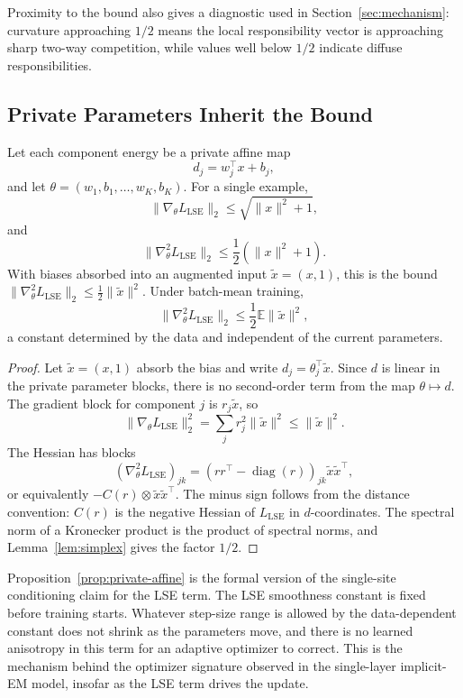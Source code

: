 Proximity to the bound also gives a diagnostic used in
Section~\ref{sec:mechanism}: curvature approaching $1/2$ means the local
responsibility vector is approaching sharp two-way competition, while values
well below $1/2$ indicate diffuse responsibilities.

\subsection{Private Parameters Inherit the Bound}
\begin{proposition}
\label{prop:private-affine}
Let each component energy be a private affine map
\[
    d_j = w_j^\top x + b_j,
\]
and let $\theta=(w_1,b_1,\ldots,w_K,b_K)$. For a single example,
\[
    \|\nabla_\theta L_{\mathrm{LSE}}\|_2
    \le \sqrt{\|x\|^2+1},
\]
and
\[
    \|\nabla_\theta^2 L_{\mathrm{LSE}}\|_2
    \le \frac{1}{2}(\|x\|^2+1).
\]
With biases absorbed into an augmented input $\tilde{x}=(x,1)$, this is the
bound $\|\nabla^2_\theta L_{\mathrm{LSE}}\|_2\le
\frac{1}{2}\|\tilde{x}\|^2$. Under batch-mean training,
\[
    \|\nabla_\theta^2 L_{\mathrm{LSE}}\|_2
    \le
    \frac{1}{2}\mathbb{E}\|\tilde{x}\|^2,
\]
a constant determined by the data and independent of the current parameters.
\end{proposition}
\begin{proof}
Let $\tilde{x}=(x,1)$ absorb the bias and write $d_j=\theta_j^\top\tilde{x}$.
Since $d$ is linear in the private parameter blocks, there is no second-order
term from the map $\theta\mapsto d$. The gradient block for component $j$ is
$r_j\tilde{x}$, so
\[
    \|\nabla_\theta L_{\mathrm{LSE}}\|_2^2
    =
    \sum_j r_j^2 \|\tilde{x}\|^2
    \le
    \|\tilde{x}\|^2.
\]
The Hessian has blocks
\[
    \left(\nabla_\theta^2 L_{\mathrm{LSE}}\right)_{jk}
    =
    \left(rr^\top-\operatorname{diag}(r)\right)_{jk}
    \tilde{x}\tilde{x}^\top,
\]
or equivalently $-C(r)\otimes \tilde{x}\tilde{x}^\top$. The minus sign follows
from the distance convention: $C(r)$ is the negative Hessian of
$L_{\mathrm{LSE}}$ in $d$-coordinates. The spectral norm of a Kronecker
product is the product of spectral norms, and Lemma~\ref{lem:simplex} gives
the factor $1/2$.
\end{proof}
Proposition~\ref{prop:private-affine} is the formal version of the
single-site conditioning claim for the LSE term. The LSE smoothness constant
is fixed before training starts. Whatever step-size range is allowed by the
data-dependent constant does not shrink as the parameters move, and there is
no learned anisotropy in this term for an adaptive optimizer to correct. This
is the mechanism behind the optimizer signature observed in the single-layer
implicit-EM model, insofar as the LSE term drives the update.

